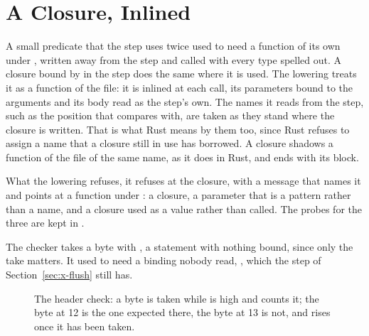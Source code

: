 \section{A Closure, Inlined}
\label{sec:x-closure}

A small predicate that the step uses twice used to need a function of
its own under \code{\#[lower]}, written away from the step and called
with every type spelled out. A closure bound by  in the step
does the same where it is used. The lowering treats it as a function
of the file: it is inlined at each call, its parameters bound to the
arguments and its body read as the step's own. The names it reads from
the step, such as the position  that  compares with,
are taken as they stand where the closure is written. That is what
Rust means by them too, since Rust refuses to assign a name that a
closure still in use has borrowed. A closure shadows a function of
the file of the same name, as it does in Rust, and ends with its
block.

What the lowering refuses, it refuses at the closure, with a message
that names it and points at a function under \code{\#[lower]}: a
 closure, a parameter that is a pattern rather than a
name, and a closure used as a value rather than called. The probes for
the three are kept in .

The checker takes a byte with , a statement
with nothing bound, since only the take matters. It used to need a
binding nobody read, , which the
step of Section~\ref{sec:x-flush} still has.

\begin{figure}[htbp]
\centering

\caption{The header check: a byte is taken while  is high and
 counts it; the byte at 12 is the one expected there, the
byte at 13 is not, and  rises once it has been taken.}
\label{fig:x-closure}
\end{figure}




